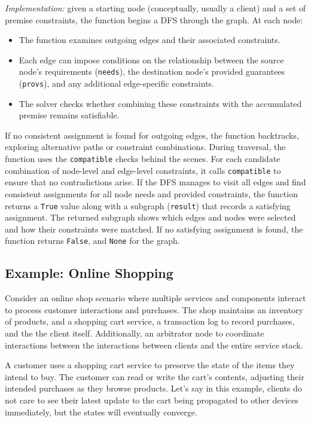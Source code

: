 
\textit{Implementation:} given a starting node (conceptually, usually
a client) and a
set of premise constraints, the function begins a DFS through the graph. At each
node:
\begin{itemize}
  \item The function examines outgoing edges and their associated constraints.
  \item Each edge can impose conditions on the relationship between
    the source node's
    requirements (\texttt{needs}), the destination node's provided
    guarantees (\texttt{provs}),
    and any additional edge-specific constraints.
  \item The solver checks whether combining these constraints with
    the accumulated
    premise remains satisfiable.
\end{itemize}
If no consistent assignment is found for outgoing edges, the function
backtracks, exploring alternative paths or constraint combinations. During
traversal, the function uses the \texttt{compatible} checks behind
the scenes. For each
candidate combination of node-level and edge-level constraints, it
calls \texttt{compatible} to
ensure that no contradictions arise. If the DFS manages to visit all edges and
find consistent assignments for all node needs and provided constraints, the
function returns a \texttt{True} value along with a subgraph
(\texttt{result}) that records a
satisfying assignment. The returned subgraph shows which edges and nodes were
selected and how their constraints were matched. If no satisfying assignment is
found, the function returns \texttt{False}, and \texttt{None} for the graph.

\subsection{Example: Online Shopping}

Consider an online shop scenario where multiple services and components interact
to process customer interactions and purchases. The shop maintains an inventory
of products, and a shopping cart service, a transaction log to record purchases,
and the the client itself. Additionally, an arbitrator node to coordinate
interactions between the interactions between clients and the entire service
stack.

A customer uses a shopping cart service to preserve the state of the items they
intend to buy. The customer can read or write the cart's contents, adjusting
their intended purchases as they browse products. Let's say in this example,
clients do not care to see their latest update to the cart being propagated to
other devices immediately, but the states will eventually converge.


